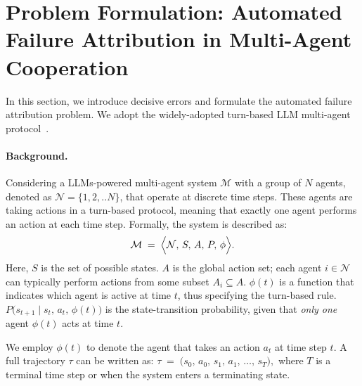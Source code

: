 \section{Problem Formulation: Automated Failure Attribution in Multi-Agent Cooperation}
\label{sec:problem_formulation}

In this section, we introduce decisive errors and formulate the automated failure attribution problem. We adopt the widely-adopted turn-based LLM multi-agent protocol~\citep{wu2023autogen,li2023camel,hong2023metagpt}.

\paragraph{Background.} Considering a LLMs-powered multi-agent system $\mathcal{M}$ with a group of $N$ agents, denoted as $\mathcal{N} = \{1, 2, .. N\}$, 
that operate at discrete time steps. These agents are taking actions in a turn-based protocol, meaning that exactly one agent performs an action at each time step. Formally, the system is described as:
\begin{align}
\mathcal{M} 
\;=\; 
\Bigl\langle 
  \mathcal{N},\, 
  S,\, 
  A,\, 
  P,\, 
  \phi 
\Bigr\rangle.
\end{align}
Here, $S$ is the set of possible states. $A$ is the global action set; each agent $i\in\mathcal{N}$ can typically perform actions from some subset $A_i \subseteq A$.
$\phi(t)$ is a function that indicates which agent is active at time $t$, thus specifying the turn-based rule. $P\bigl(s_{t+1} \mid s_t,\, a_t,\, \phi(t)\bigr)$ is the state-transition probability, given that \emph{only one} agent $\phi(t)$ acts at time $t$.

We employ $\phi(t)$ to denote the agent that takes an action $a_t$ at time step $t$.  A full trajectory $\tau$ can be written as:
$
\tau 
\;=\;
\bigl( s_0,\, a_0,\,
        s_1,\, a_1,\,
        \dots,\,
        s_T \bigr),
$
where $T$ is a terminal time step or when the system enters a terminating state.


